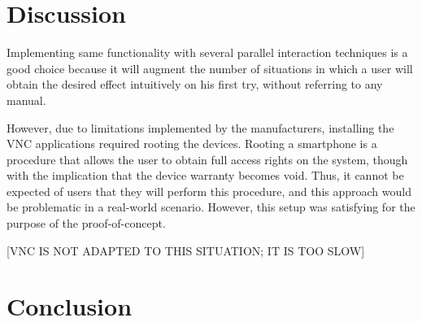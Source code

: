 \chapter{Discussion}
\label{discussion}

Implementing same functionality with several parallel interaction techniques is a good choice because it will augment the number of situations in which a user will obtain the desired effect intuitively on his first try, without referring to any manual.


However, due to limitations implemented by the manufacturers, installing the VNC applications required rooting the devices.
Rooting a smartphone is a procedure that allows the user to obtain full access rights on the system, though with the implication that the device warranty becomes void.
Thus, it cannot be expected of users that they will perform this procedure, and this approach would be problematic in a real-world scenario.
However, this setup was satisfying for the purpose of the proof-of-concept.

[VNC IS NOT ADAPTED TO THIS SITUATION; IT IS TOO SLOW]


\chapter{Conclusion}
\label{conclusion}